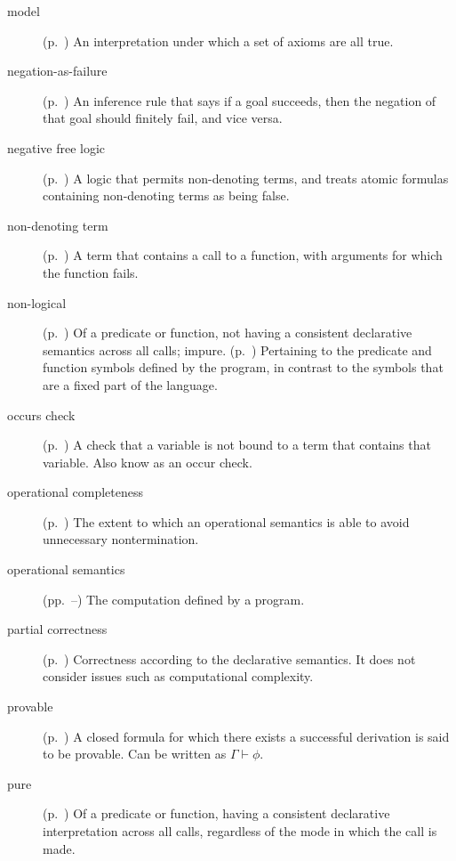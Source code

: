 \begin{description}
\item[model]
(p.~\pageref{gi:model})
An interpretation under which a set of axioms are all true.

\item[negation-as-failure]
(p.~\pageref{sec:naf})
An inference rule that says
if a goal succeeds, then the negation of that goal should finitely fail,
and vice versa.

\item[negative free logic]
(p.~\pageref{gi:nfl})
A logic that permits non-denoting terms,
and treats atomic formulas containing non-denoting terms as being false.

\item[non-denoting term]
(p.~\pageref{gi:non-denoting})
A term that contains a call to a  function,
with arguments for which the function fails.

\item[non-logical]
(p.~\pageref{gi:non-logical})
Of a predicate or function,
not having a consistent declarative semantics across all calls; impure.
(p.~\pageref{gi:non-logical2})
Pertaining to the predicate and function symbols defined by the program,
in contrast to the symbols that are a fixed part of the language.

\item[occurs check]
(p.~\pageref{gi:occurs-check})
A check that a variable is not bound to a term that contains that variable.
Also know as an occur check.

\item[operational completeness]
(p.~\pageref{sec:incompleteness})
The extent to which an operational semantics
is able to avoid unnecessary nontermination.

\item[operational semantics]
(pp.~\pageref{sec:op-sem}--\pageref{end:op-sem})
The computation defined by a program.

\item[partial correctness]
(p.~\pageref{gi:partial-correctness})
Correctness according to the declarative semantics.
It does not consider issues such as computational complexity.

\item[provable]
(p.~\pageref{gi:provable})
A closed formula for which there exists a successful derivation
is said to be provable.
Can be written as $\Gamma \vdash \phi$.

\item[pure]
(p.~\pageref{gi:pure})
Of a predicate or function,
having a consistent declarative interpretation across all calls,
regardless of the mode in which the call is made.


\end{description}
